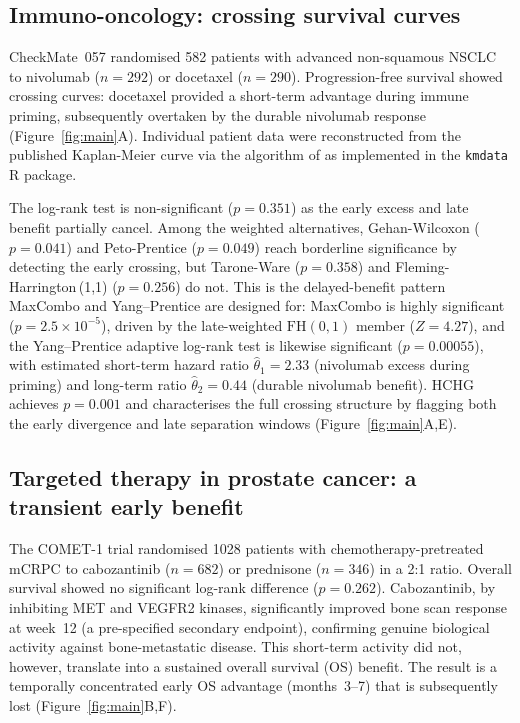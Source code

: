 \documentclass[unnumsec,webpdf,contemporary,large]{oup-authoring-template}
\begin{document}
\subsection*{Immuno-oncology: crossing survival curves}

CheckMate~057 \citep{borghaei2015} randomised 582 patients with advanced
non-squamous NSCLC to nivolumab ($n=292$) or docetaxel ($n=290$).
Progression-free survival showed crossing curves: docetaxel provided a
short-term advantage during immune priming, subsequently overtaken by the
durable nivolumab response (Figure~\ref{fig:main}A). Individual patient
data were reconstructed from the published Kaplan-Meier curve via the
algorithm of \citet{guyot2012} as implemented in the \texttt{kmdata}
R package.

The log-rank test is non-significant ($p = 0.351$) as the early excess
and late benefit partially cancel. Among the weighted alternatives,
Gehan-Wilcoxon ($p = 0.041$) and Peto-Prentice ($p = 0.049$) reach
borderline significance by detecting the early crossing, but
Tarone-Ware ($p = 0.358$) and Fleming-Harrington\,(1,1) ($p = 0.256$)
do not. This is the delayed-benefit pattern MaxCombo and Yang--Prentice
are designed for: MaxCombo is highly significant ($p = 2.5 \times 10^{-5}$),
driven by the late-weighted $\mathrm{FH}(0,1)$ member ($Z = 4.27$), and
the Yang--Prentice adaptive log-rank test is likewise significant
($p = 0.00055$), with estimated short-term hazard ratio $\hat\theta_1 = 2.33$
(nivolumab excess during priming) and long-term ratio $\hat\theta_2 = 0.44$
(durable nivolumab benefit). HCHG achieves $p = 0.001$ and characterises
the full crossing structure by flagging both the early divergence and late
separation windows (Figure~\ref{fig:main}A,E).

\subsection*{Targeted therapy in prostate cancer: a transient early benefit}

The COMET-1 trial \citep{smith2016} randomised 1028 patients with
chemotherapy-pretreated mCRPC to cabozantinib ($n=682$) or prednisone
($n=346$) in a 2:1 ratio. Overall survival showed no significant
log-rank difference ($p = 0.262$). Cabozantinib, by inhibiting
MET and VEGFR2 kinases, significantly improved bone scan response at
week~12 (a pre-specified secondary endpoint), confirming genuine
biological activity against bone-metastatic disease.
This short-term activity did not, however, translate into a sustained overall survival (OS) benefit. 
The result is a temporally concentrated early OS advantage
(months~3--7) that is subsequently lost (Figure~\ref{fig:main}B,F).
\end{document}

